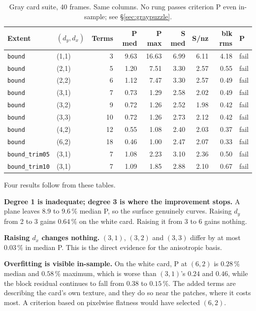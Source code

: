 \documentclass[11pt, a4paper]{article}
\newcommand{\code}[1]{\texttt{#1}}
\newcommand{\pct}{\,\%}
\begin{document}
\begin{table}[htbp]
\centering
\caption{Gray card suite, 40 frames.
Same columns.
No rung passes criterion P even in-sample;
see \S\ref{sec:graypuzzle}.}
\label{tab:ladder-gray}
\begin{tabular}{llrrrrrrl}
\toprule
Extent & $(d_y,d_x)$ & Terms & P med & P max & S med & S/nz & blk rms & P \\
\midrule
\code{bound} & (1,1) &  3 & 9.63 & 16.63 & 6.99 & 6.11 & 4.18 & fail \\
\code{bound} & (2,1) &  5 & 1.20 &  7.51 & 3.30 & 2.57 & 0.55 & fail \\
\code{bound} & (2,2) &  6 & 1.12 &  7.47 & 3.30 & 2.57 & 0.49 & fail \\
\code{bound} & (3,1) &  7 & 0.73 &  1.29 & 2.58 & 2.02 & 0.49 & fail \\
\code{bound} & (3,2) &  9 & 0.72 &  1.26 & 2.52 & 1.98 & 0.42 & fail \\
\code{bound} & (3,3) & 10 & 0.72 &  1.26 & 2.73 & 2.12 & 0.42 & fail \\
\code{bound} & (4,2) & 12 & 0.55 &  1.08 & 2.40 & 2.03 & 0.37 & fail \\
\code{bound} & (6,2) & 18 & 0.46 &  1.00 & 2.47 & 2.07 & 0.33 & fail \\
\midrule
\code{bound\_trim05} & (3,1) & 7 & 1.08 & 2.23 & 3.10 & 2.36 & 0.50 & fail \\
\code{bound\_trim10} & (3,1) & 7 & 1.09 & 1.85 & 2.88 & 2.10 & 0.67 & fail \\
\bottomrule
\end{tabular}
\end{table}

Four results follow from these tables.

\textbf{Degree 1 is inadequate; degree 3 is where the improvement stops.}
A plane leaves $8.9$ to $9.6\pct$ median P,
so the surface genuinely curves.
Raising $d_y$ from 2 to 3 gains $0.64\pct$ on the white card.
Raising it from 3 to 6 gains nothing.

\textbf{Raising $d_x$ changes nothing.}
$(3,1)$, $(3,2)$ and $(3,3)$ differ by at most $0.03\pct$ in median P.
This is the direct evidence for the anisotropic basis.

\textbf{Overfitting is visible in-sample.}
On the white card,
P at $(6,2)$ is $0.28\pct$ median and $0.58\pct$ maximum,
which is worse than $(3,1)$'s $0.24$ and $0.46$,
while the block residual continues to fall from $0.38$ to $0.15\pct$.
The added terms are describing the card's own texture,
and they do so near the patches, where it costs most.
A criterion based on pixelwise flatness would have selected $(6,2)$.
\end{document}
